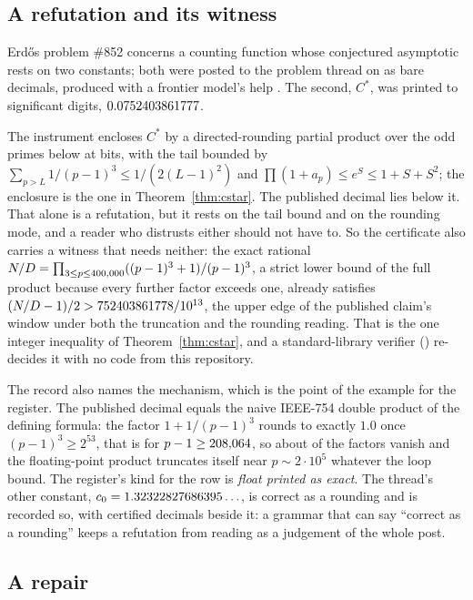 \documentclass[11pt]{article}
\theoremstyle{plain}
\theoremstyle{definition}
\begin{document}
\subsection{A refutation and its witness}\label{sec:cstar}

Erd\H{o}s problem \#852 concerns a counting function whose conjectured asymptotic rests on two constants; both were posted to the problem thread on \CstarThreadDate{} as bare decimals, produced with a frontier model's help \cite{ErdosProblems}. The second, $C^*$, was printed to \CstarPublishedDigits{} significant digits, $0.0752403861777$.

The instrument encloses $C^*$ by a directed-rounding partial product over the \CstarPrimes{} odd primes below \CstarPrimeBound{} at \CstarBits{} bits, with the tail bounded by $\sum_{p>L}1/(p-1)^3\le1/(2(L-1)^2)$ and $\prod(1+a_p)\le e^S\le1+S+S^2$; the enclosure is the one in Theorem~\ref{thm:cstar}. The published decimal lies below it. That alone is a refutation, but it rests on the tail bound and on the rounding mode, and a reader who distrusts either should not have to. So the certificate also carries a witness that needs neither: the exact rational $N/D=\prod_{3\le p\le400{,}000}((p-1)^3+1)/(p-1)^3$, a strict lower bound of the full product because every further factor exceeds one, already satisfies $(N/D-1)/2>752403861778/10^{13}$, the upper edge of the published claim's window under both the truncation and the rounding reading. That is the one integer inequality of Theorem~\ref{thm:cstar}, and a standard-library verifier (\texttt{\CstarVerifier}) re-decides it with no code from this repository.

The record also names the mechanism, which is the point of the example for the register. The published decimal equals the naive IEEE-754 double product of the defining formula: the factor $1+1/(p-1)^3$ rounds to exactly $1.0$ once $(p-1)^3\ge2^{53}$, that is for $p-1\ge208{,}064$, so about \CstarVanish{} of the factors vanish and the floating-point product truncates itself near $p\sim2\cdot10^5$ whatever the loop bound. The register's kind for the row is \emph{float printed as exact}. The thread's other constant, $c_0=1.32322827686395\ldots$, is correct as a rounding and is recorded so, with \CzeroDigits{} certified decimals beside it: a grammar that can say ``correct as a rounding'' keeps a refutation from reading as a judgement of the whole post.

\subsection{A repair}\label{sec:repair}
\end{document}
